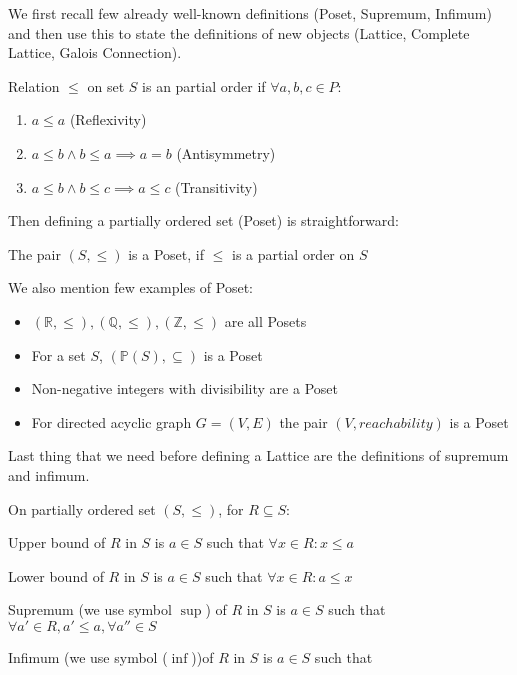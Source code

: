 We first recall few already well-known definitions (Poset, Supremum, Infimum) and then use this
to state the definitions of new objects (Lattice, Complete Lattice, Galois Connection).

\begin{defn}
    Relation $\leq$ on set $S$ is an partial order if $\forall a, b, c \in P$:
    \begin{enumerate}
        \item $a \leq a$ (Reflexivity)
        \item $a \leq b \land b \leq a \implies a = b$ (Antisymmetry)
        \item $a \leq b \land b \leq c \implies a \leq c$ (Transitivity)
    \end{enumerate}
\end{defn}

Then defining a partially ordered set (Poset) is straightforward:

\begin{defn}[Poset]
    The pair $(S, \leq)$ is a Poset, if $\leq$ is a partial order on $S$
\end{defn}

\begin{example}
    We also mention few examples of Poset:
    \begin{itemize}
        \item $(\mathbb{R}, \leq), (\mathbb{Q}, \leq), (\mathbb{Z}, \leq)$ are all Posets
        \item For a set $S$, $(\mathbb{P}(S), \subseteq)$ is a Poset
        \item Non-negative integers with divisibility are a Poset
        \item For directed acyclic graph $G=(V,E)$ the pair $(V, reachability)$ is a Poset
    \end{itemize}
\end{example}

Last thing that we need before defining a Lattice are the definitions of supremum and infimum.

\begin{defn}
    On partially ordered set $(S, \leq)$, for $R \subseteq S$:

    Upper bound of $R$ in $S$ is $a \in S$ such that $\forall x \in R: x \leq a$

    Lower bound of $R$ in $S$ is $a \in S$ such that $\forall x \in R: a \leq x$

    Supremum (we use symbol $\sup$) of $R$ in $S$ is $a \in S$
    such that $\forall a' \in R, a' \leq a, \forall a'' \in S$ %

    Infimum (we use symbol ($\inf$))of $R$ in $S$ is $a \in S$ such that
\end{defn}

